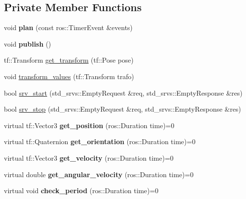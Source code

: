 \subsection*{Private Member Functions}
\begin{DoxyCompactItemize}
\item 
void {\bfseries plan} (const ros\+::\+Timer\+Event \&events)\hypertarget{classPlanner_a6ccd3cb4a24886ddeff615e665f2fbbd}{}\label{classPlanner_a6ccd3cb4a24886ddeff615e665f2fbbd}

\item 
void {\bfseries publish} ()\hypertarget{classPlanner_aa8937e0a808cebc224393438941515e4}{}\label{classPlanner_aa8937e0a808cebc224393438941515e4}

\item 
tf\+::\+Transform \hyperlink{classPlanner_a311803ff0901b953c4ff9db7a3f5bb01}{get\+\_\+transform} (tf\+::\+Pose pose)
\item 
void \hyperlink{classPlanner_a0ce8028259452e2e17ed07bbb0c8463a}{transform\+\_\+values} (tf\+::\+Transform trafo)
\item 
bool \hyperlink{classPlanner_a2a6a50634353cf10b7e4d0e1266c55b7}{srv\+\_\+start} (std\+\_\+srvs\+::\+Empty\+Request \&req, std\+\_\+srvs\+::\+Empty\+Response \&res)
\item 
bool \hyperlink{classPlanner_a65994104a9915ef59dd2360008bb24f0}{srv\+\_\+stop} (std\+\_\+srvs\+::\+Empty\+Request \&req, std\+\_\+srvs\+::\+Empty\+Response \&res)
\item 
virtual tf\+::\+Vector3 {\bfseries get\+\_\+position} (ros\+::\+Duration time)=0\hypertarget{classPlanner_ab388545a3fd2f37f70403d8484473a12}{}\label{classPlanner_ab388545a3fd2f37f70403d8484473a12}

\item 
virtual tf\+::\+Quaternion {\bfseries get\+\_\+orientation} (ros\+::\+Duration time)=0\hypertarget{classPlanner_a161fc00d031fd65914dae8f4b2edeffb}{}\label{classPlanner_a161fc00d031fd65914dae8f4b2edeffb}

\item 
virtual tf\+::\+Vector3 {\bfseries get\+\_\+velocity} (ros\+::\+Duration time)=0\hypertarget{classPlanner_a02af8b9ab29a19bd82c1cc35afcf2cc5}{}\label{classPlanner_a02af8b9ab29a19bd82c1cc35afcf2cc5}

\item 
virtual double {\bfseries get\+\_\+angular\+\_\+velocity} (ros\+::\+Duration time)=0\hypertarget{classPlanner_ab5c6ec661acf83b1f095ba404dc4c958}{}\label{classPlanner_ab5c6ec661acf83b1f095ba404dc4c958}

\item 
virtual void {\bfseries check\+\_\+period} (ros\+::\+Duration time)=0\hypertarget{classPlanner_a1bc7f9ca05b5de8aa4c9ccda126c2be2}{}\label{classPlanner_a1bc7f9ca05b5de8aa4c9ccda126c2be2}

\end{DoxyCompactItemize}
